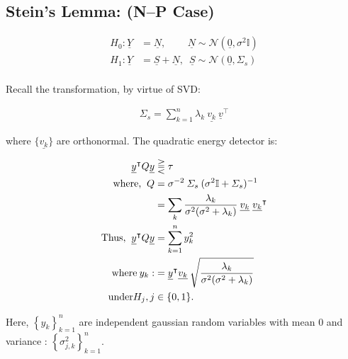 \documentclass[12pt]{report}
\begin{document}
\subsection{Stein's Lemma: (N--P Case)} 

\begin{exmp}
 
           \begin{align*}
                  H_0 : \underline{Y}  &=\underline{N}, \; \; \; \; \; \; \; \: \underline{N} \sim \mathcal{N}( \underline{0}, \sigma^{2}\mathbb{I})  \\
                  H_1 : \underline{Y}  &=\underline{S} + \underline{N}, \; \: \underline{S} \sim \mathcal{N}( \underline{0}, \varSigma_{s}) \\ 
           \end{align*}

\noindent Recall the transformation, by virtue of SVD:

          \begin{align}
                  \varSigma_{s} =  \sum_{k=1}^{n} \lambda_k \:\underline{v_k} \:\underline{v}^\intercal 
          \end{align}

\noindent  where $\{ \underline{v_k}\}$  are orthonormal.  The quadratic energy detector is: 

            \begin{align}
                            \underline{y}^\intercal Q\underline{y}&\gtreqqless \tau \\
                            \text{where, \:} Q &=  \sigma^{-2} \:\varSigma_{s} \: (\sigma^{2}\mathbb{I}+ \varSigma_{s} )^{-1} \nonumber \\
                                                           &= \sum_{k} \frac{\lambda_k}{\sigma^{2} (\sigma^{2} + \lambda_k )} \: \underline{v_k} \; \underline{v_k}^\intercal \\
                            \text{Thus, \:} \underline{y}^\intercal Q\underline{y} &= \sum_{k=1}^{n} y_k^{2} \\
                            \text{ where\:} y_k :&= \underline{y}^\intercal \underline{v_k} \: \sqrt{ \frac{\lambda_k}{\sigma^{2} (\sigma^{2} + \lambda_k )}} \\
                             \text{under} H_j, j &\in \{0,1\}.  \nonumber
            \end{align}


\noindent Here, $\left\{y_k\right\}^{n}_{k=1}$  are independent gaussian random variables with mean 0 and variance :   $\left\{\sigma_{j,k}^{2}\right\}^{n}_{k=1}$. \\


\end{exmp}
\end{document}
